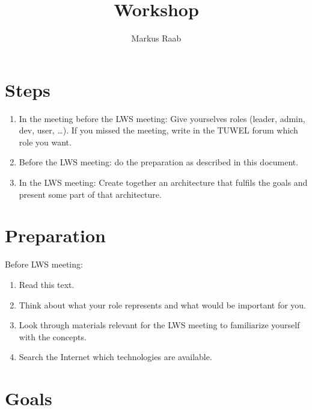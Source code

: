 



\setcounter{chapter}{1} %


\title{Workshop}
\author{Markus Raab}




\maketitle
\doclicenseThis

\section{Steps}

\begin{enumerate}
	\item In the meeting before the LWS meeting: Give yourselves roles (leader, admin, dev, user, \dots).
	If you missed the meeting, write in the TUWEL forum which role you want.
	\item Before the LWS meeting: do the preparation as described in this document.
	\item In the LWS meeting: Create together an architecture that fulfils the goals and present some part of that architecture.
\end{enumerate}

\section{Preparation}

Before LWS meeting:

\begin{enumerate}
	\item Read this text.
	\item Think about what your role represents and what would be important for you.
	\item Look through materials relevant for the LWS meeting to familiarize yourself with the concepts.
	\item Search the Internet which technologies are available.
\end{enumerate}

\section{Goals}


